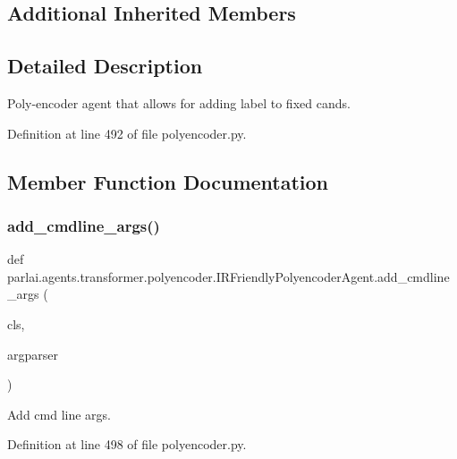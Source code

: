 \subsection*{Additional Inherited Members}


\subsection{Detailed Description}
\begin{DoxyVerb}Poly-encoder agent that allows for adding label to fixed cands.
\end{DoxyVerb}
 

Definition at line 492 of file polyencoder.\+py.



\subsection{Member Function Documentation}
\mbox{\label{classparlai_1_1agents_1_1transformer_1_1polyencoder_1_1IRFriendlyPolyencoderAgent_afbf30376e853d1a5f9a52b1ae3453aa2}} 
\subsubsection{\texorpdfstring{add\+\_\+cmdline\+\_\+args()}{add\_cmdline\_args()}}
{\footnotesize\ttfamily def parlai.\+agents.\+transformer.\+polyencoder.\+I\+R\+Friendly\+Polyencoder\+Agent.\+add\+\_\+cmdline\+\_\+args (\begin{DoxyParamCaption}\item[{}]{cls,  }\item[{}]{argparser }\end{DoxyParamCaption})}

\begin{DoxyVerb}Add cmd line args.
\end{DoxyVerb}
 

Definition at line 498 of file polyencoder.\+py.


